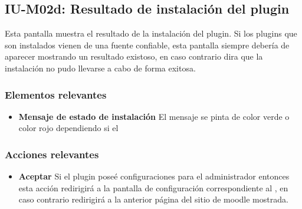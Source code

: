 
\subsection{IU-M02d: Resultado de instalación del plugin}

 Esta pantalla muestra el resultado de la instalación del plugin. Si los plugins
 que son instalados vienen de una fuente confiable, esta pantalla siempre debería
 de aparecer mostrando un resultado existoso, en caso contrario dira que la instalación
 no pudo llevarse a cabo de forma exitosa.


\subsubsection{Elementos relevantes}

    \begin{itemize}
    \item {\bf Mensaje de estado de instalación}
        El mensaje se pinta de color verde o color rojo dependiendo si el 
    \end{itemize}

\subsubsection{Acciones relevantes}

    \begin{itemize}
    \item {\bf Aceptar}
        Si el plugin poseé configuraciones para el administrador entonces esta acción
        redirigirá a la pantalla de configuración correspondiente al ,
        en caso contrario redirigirá a la anterior página del sitio de moodle mostrada.
    \end{itemize}

\clearpage
